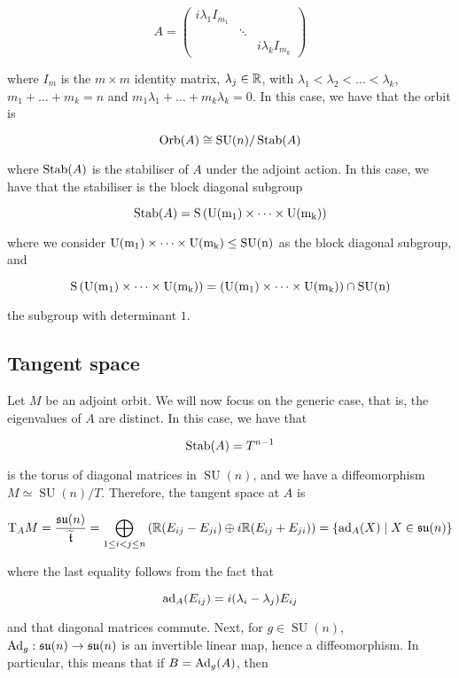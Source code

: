 \documentclass{article}
\DeclareMathOperator{\SU}{SU}
\newcommand{\su}{\mathfrak{su}}
\renewcommand{\tilde}{\widetilde}
\begin{document}
\[A = \begin{pmatrix}
    i\lambda_1 I_{m_1} \\
    & \ddots \\
    & & i\lambda_k I_{m_k}
\end{pmatrix}\]

where \(I_m\) is the \(m \times m\) identity matrix, \(\lambda_j \in \mathbb{R}\), with \(\lambda_1 < \lambda_2 < \dots < \lambda_k\), \(m_1 + \dots + m_k = n\) and \(m_1\lambda_1 + \dots + m_k\lambda_k = 0\). In this case, we have that the orbit is

\[\Orb(A) \cong \SU(n)/\Stab(A)\]

where \(\operatorname{Stab}(A)\) is the stabiliser of \(A\) under the adjoint action. In this case, we have that the stabiliser is the block diagonal subgroup

\[\operatorname{Stab}(A) = \rm S\left(\rm U(m_1) \times \dots \times \rm U(m_k)\right)\]

where we consider \(\rm U(m_1) \times \cdots \times \rm U(m_k) \le \SU(n)\) as the block diagonal subgroup, and

\[\rm S\left(\rm U(m_1) \times \dots \times \rm U(m_k)\right) = \left(\rm U(m_1) \times \cdots \times \rm U(m_k)\right) \cap \SU(n)\]

the subgroup with determinant \(1\).

\subsection{Tangent space}

Let \(M\) be an adjoint orbit. We will now focus on the generic case, that is, the eigenvalues of \(A\) are distinct. In this case, we have that

\[\operatorname{Stab}(A) = T^{n-1}\]

is the torus of diagonal matrices in \(\SU(n)\), and we have a diffeomorphism \(M \simeq \SU(n)/T\). Therefore, the tangent space at \(A\) is

\[\TT_AM = \frac{\su(n)}{\tilde \mft} = \bigoplus_{1 \le i < j \le n} \left(\R(E_{ij} - E_{ji}) \oplus i\R (E_{ij} + E_{ji})\right) = \{\ad_A(X) \mid X \in \su(n)\}\]

where the last equality follows from the fact that

\[\operatorname{ad}_A(E_{ij}) = i(\lambda_i - \lambda_j)E_{ij}\]

and that diagonal matrices commute. Next, for \(g \in \SU(n)\), \(\Ad_g : \su(n) \to \su(n)\) is an invertible linear map, hence a diffeomorphism. In particular, this means that if \(B = \operatorname{Ad}_g(A)\), then
\end{document}
